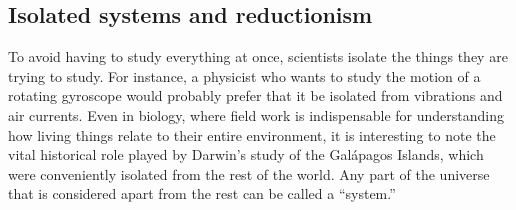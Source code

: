 


\subsection{Isolated systems and reductionism}

To avoid having to study everything at once, scientists
isolate the things they are trying to study. For instance, a
physicist who wants to study the motion of a rotating
gyroscope would probably prefer that it be isolated from
vibrations and air currents. Even in biology, where field
work is indispensable for understanding how living things
relate to their entire environment, it is interesting to
note the vital historical role played by Darwin's
study of the Gal\'{a}pagos Islands, which were conveniently
isolated from the rest of the world. Any part of the
universe that is considered apart from the rest can be
called a ``system.''

